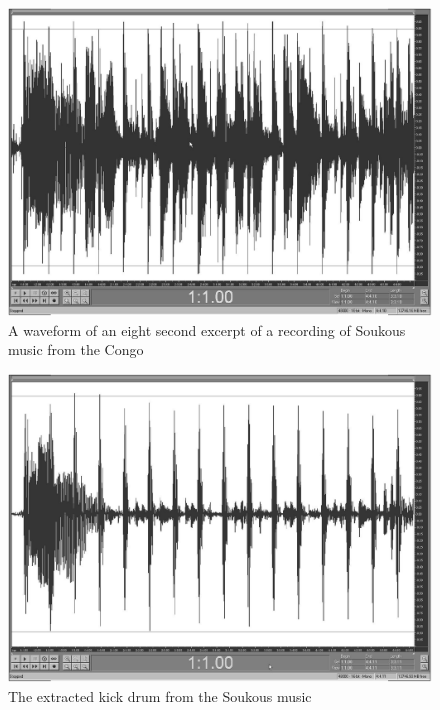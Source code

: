 \begin{landscape}
  \begin{figure}
    \centering
    \includegraphics[width=7in]{ZingZongOriginal.pdf}
    \caption{A waveform of an eight second excerpt of a recording of
      Soukous music from the Congo}
    \label{zingzongoriginal}
  \end{figure}
\end{landscape}

\begin{landscape}
  \begin{figure}
    \centering
    \includegraphics[width=7in]{ZingZongExtractedKick.pdf}
    \caption{The extracted kick drum from the Soukous music}
    \label{zingzongkick}
  \end{figure}
\end{landscape}

